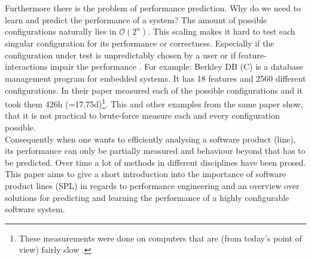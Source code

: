 Furthermore there is the problem of performance prediction. Why do we need to learn and predict the performance of a system?
The amount of possible configurations naturally lies in $\mathcal{O}(2^n)$. This scaling makes it hard to test each singular configuration for its performance or correctness. Especially if the configuration under test is unpredictably chosen by a user \cite{AutomatedFeatureDetectionSiegmund2012} or if feature-interactions impair the performance \cite{VariabilityAwarePerformancePredictionJianmeiSigmundApel}. For example:
Berkley DB (C) is a database management program for embedded systems. It has 18 features and 2560 different configurations. In their paper  \citet{AutomatedFeatureDetectionSiegmund2012} measured each of the possible configurations and it took them 426h (=17,75d)\footnote{These measurements were done on computers that are (from today's point of view) fairly slow \cite{AutomatedFeatureDetectionSiegmund2012,CPUDatabase}.}. This and other examples from the same paper show, that it is not practical to brute-force measure each and every configuration possible. \\ 
Consequently when one wants to efficiently analysing a software product (line), its performance can only be partially measured and behaviour beyond that has to be predicted. Over time a lot of methods in different disciplines have been prosed.\\
This paper aims to give a short introduction into the importance of software product lines (SPL) in regards to performance engineering and an overview over solutions for predicting and learning the performance of a highly configurable software system.
